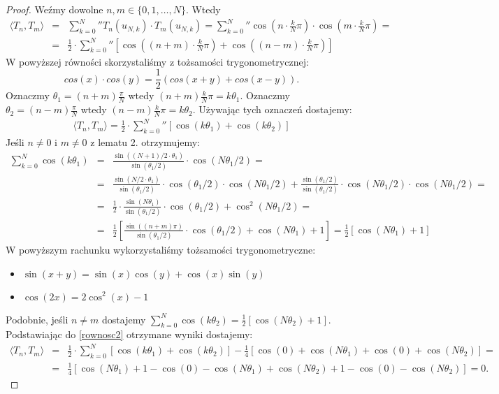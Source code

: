 \documentclass[12pt,wide]{mwart}
\begin{document}
\begin{proof}
Weźmy dowolne $n,m \in \{0,1,\ldots,N\}$. Wtedy
\begin{eqnarray*}
\langle T_n,T_m \rangle &=& \sum_{k=0}^N'' T_n(u_{N,k})\cdot T_m(u_{N,k}) =  \sum_{k=0}^N'' \cos\left(n \cdot \frac{k}{N}\pi\right)\cdot \cos\left(m \cdot \frac{k}{N}\pi\right) = \\&=& \frac{1}{2}\cdot \sum_{k=0}^N'' \left[\cos\left((n+m)\cdot \frac{k}{N}\pi\right) + \cos\left((n-m)\cdot \frac{k}{N}\pi\right)\right]
\end{eqnarray*}
W powyższej równości skorzystaliśmy z tożsamości trygonometrycznej: $$cos(x) \cdot cos(y) = \frac{1}{2}(cos(x+y)+cos(x-y)).$$Oznaczmy $\theta_1 = (n+m)\frac{\pi}{N}$ wtedy $(n+m)\frac{k}{N}\pi = k\theta_1.$ Oznaczmy $\theta_2 = (n-m)\frac{\pi}{N}$ wtedy $(n-m)\frac{k}{N}\pi = k\theta_2$.
Używając tych oznaczeń dostajemy:
\begin{eqnarray}\label{rownosc2}
\langle T_n,T_m \rangle = \frac{1}{2} \cdot \sum_{k=0}^N'' [\cos(k\theta_1) + \cos(k\theta_2)] 
\end{eqnarray}
Jeśli $n \neq 0$ i $m \neq 0$  z lematu 2. otrzymujemy:
\begin{eqnarray*}
\sum_{k=0}^N \cos(k\theta_1) &=& \frac{\sin((N+1)/2 \cdot \theta_1)}{\sin(\theta_1 /2)}\cdot \cos(N\theta_1 /2) =\\ &=&
\frac{\sin(N/2 \cdot \theta_1)}{\sin(\theta_1 /2)} \cdot \cos(\theta_1 /2) \cdot \cos(N\theta_1 /2) + \frac{\sin(\theta_1 /2)}{\sin(\theta_1 /2)} \cdot \cos(N\theta_1 /2) \cdot \cos(N\theta_1 /2) = \\ &=&
\frac{1}{2}\cdot \frac{\sin(N\theta_1)}{\sin(\theta_1 /2)} \cdot \cos(\theta_1 /2) + \cos^2(N\theta_1 /2) =\\ &=&
\frac{1}{2}\left[\frac{\sin((n+m)\pi)}{\sin(\theta_1 /2)} \cdot \cos(\theta_1 /2) + \cos(N\theta_1)+1\right] = \frac{1}{2}\left[\cos(N\theta_1)+1\right]
\end{eqnarray*}
W powyższym rachunku wykorzystaliśmy tożsamości trygonometryczne:
\begin{itemize}
\item $\sin(x+y) = \sin(x)\cos(y)+\cos(x)\sin(y)$
\item $\cos(2x) = 2\cos^2(x)-1$
\end{itemize}
Podobnie, jeśli $n \neq m$ dostajemy $ \sum_{k=0}^N \cos(k\theta_2) = \frac{1}{2}[\cos(N\theta_2)+1].$Podstawiając do \ref{rownosc2} otrzymane wyniki dostajemy:
\begin{eqnarray*}
\langle T_n,T_m \rangle &=& \frac{1}{2} \cdot \sum_{k=0}^N \left[\cos(k\theta_1) + \cos(k\theta_2)\right] - \frac{1}{4} \left[\cos(0) + \cos(N\theta_1) + \cos(0) + \cos(N\theta_2)\right] =\\ &=& \frac{1}{4}\left[\cos(N\theta_1) + 1 - \cos(0) - \cos(N\theta_1) + \cos(N\theta_2) + 1 - \cos(0) - \cos(N\theta_2)\right] = 0.

\end{eqnarray*}
\end{proof}
\end{document}
